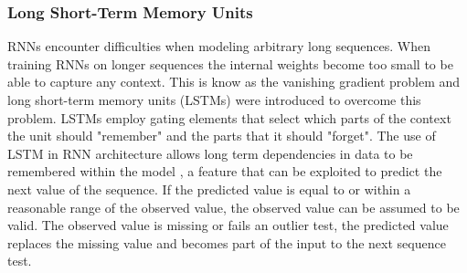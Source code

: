 \subsubsection{Long Short-Term Memory Units}
RNNs encounter difficulties when modeling arbitrary long sequences. When training RNNs on longer sequences the internal weights become too small to be able to capture any context. This is know as the vanishing gradient problem and long short-term memory units (LSTMs) were introduced to overcome this problem\cite{DBLP:journals/corr/Lipton15}. LSTMs employ gating elements that select which parts of the context the unit should "remember" and the parts that it should "forget"\cite{LSTM}.
The use of LSTM in RNN architecture allows long term dependencies in data to be remembered within the model \cite{Graves2013a}, a feature that can be exploited to predict the next value of the sequence. If the predicted value is equal to or within a reasonable range of the observed value, the observed value can be assumed to be valid. The observed value is missing or fails an outlier test, the predicted value replaces the missing value and becomes part of the input to the next sequence test.
